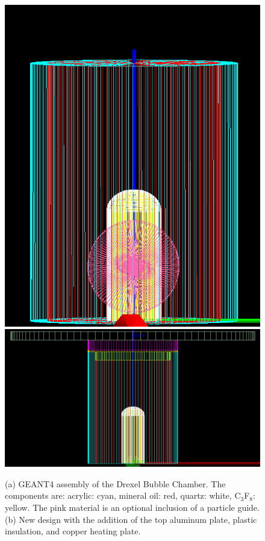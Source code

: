 \documentclass[%
12pt,
twoside,
reprint,
amsmath,amssymb,
aps,
]{article}
\begin{document}
	\begin{figure}[!b]
		\includegraphics[width=\linewidth]{Images/particle_guide_detector.png}
		\endminipage\hfill
		\includegraphics[width=\linewidth]{Images/new_design.png}
		\endminipage
		\caption{\label{tab:table-name} (a) GEANT4 assembly of the Drexel Bubble Chamber. The components are: acrylic: cyan, mineral oil: red, quartz: white, C$_{3}$F$_{8}$: yellow. The pink material is an optional inclusion of a particle guide. (b) New design with the addition of the top aluminum plate, plastic insulation, and copper heating plate.}
	\end{figure}
\end{document}
